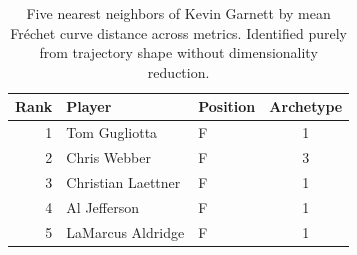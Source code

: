 \begin{table}[htbp]
  \centering\small
  \begin{tabular}{rllc}
    \toprule
    Rank & Player & Position & Archetype \\
    \midrule
    1 & Tom Gugliotta & F & 1 \\
    2 & Chris Webber & F & 3 \\
    3 & Christian Laettner & F & 1 \\
    4 & Al Jefferson & F & 1 \\
    5 & LaMarcus Aldridge & F & 1 \\
    \bottomrule
  \end{tabular}
  \caption{Five nearest neighbors of Kevin Garnett by mean Fr\'{e}chet curve distance across metrics. Identified purely from trajectory shape without dimensionality reduction.}
  \label{tab:Kevin_Garnett_frechet_curve_neighbors}
\end{table}


